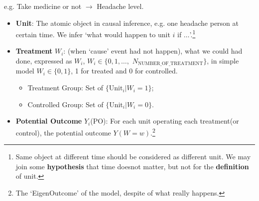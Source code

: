         e.g. Take medicine or not $ \longrightarrow $ Headache level.


\begin{itemize}[topsep=2pt,itemsep=0pt]
    \item \textbf{Unit}: The atomic object in causal inference, e.g. one headache person at certain time. We infer `what would happen to unit $ i $ if $ \ldots $'.\footnote{Same object at different time should be considered as different unit. We may join some \textbf{hypothesis}  that time doesnot matter, but not for the \textbf{definition} of unit.}
    \item \textbf{Treatment} $ W_i $: (when `cause' event had not happen), what we could had done, expressed as $ W_i $, $ W_i\in\{0,1,\ldots,$ $N_\mathrm{NUMBER\_OF\_TREATMENT}\} $, in simple model $ W_i\in\{0,1\} $, 1 for treated and 0 for controlled.
    \begin{itemize}[topsep=2pt,itemsep=0pt]
        \item Treatment Group: Set of $ \{\mathrm{Unit}_i|W_i=1\} $;
        \item Controlled Group: Set of $ \{\mathrm{Unit}_i|W_i=0 \} $.
    \end{itemize}
    \item \textbf{Potential Outcome} $ Y_i $(PO): For each unit operating each treatment(or control), the potential outcome $ Y(W=w) $.\footnote{The `EigenOutcome' of the model, despite of what really happens.
    
}
\end{itemize}
